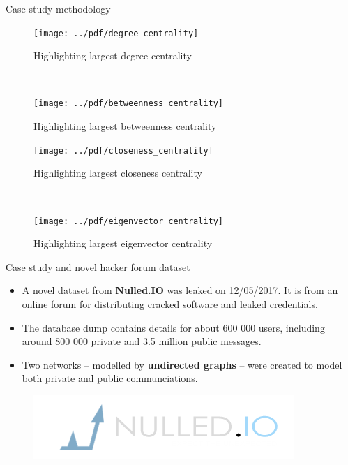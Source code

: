 \documentclass[hyperref={pdfpagelabels=false}]{beamer}
\begin{document}
\begin{frame}[fragile]
\begin{columns}[t]
\begin{column}{.45\textwidth}
\begin{block}{Case study methodology}
  \begin{figure}[H]
  	\begin{minipage}{0.48\columnwidth}
  		\centering
  		\texttt{[image: ../pdf/degree\_centrality]}
  		\caption{Highlighting largest degree centrality}
  		\label{fig:degree_centrality}
  	\end{minipage}
  	~
  	\begin{minipage}{0.48\columnwidth}
  		\centering
  		\texttt{[image: ../pdf/betweenness\_centrality]}
  		\caption{Highlighting largest betweenness centrality}
  		\label{fig:betweenness_centrality}
  	\end{minipage}
  \end{figure}

  \begin{figure}[H]
  	\begin{minipage}{0.48\columnwidth}
  		\centering
  		\texttt{[image: ../pdf/closeness\_centrality]}
  		\caption{Highlighting largest closeness centrality}
  		\label{fig:closeness_centrality}
  	\end{minipage}
  	~
  	\begin{minipage}{0.48\columnwidth}
  		\centering
  		\texttt{[image: ../pdf/eigenvector\_centrality]}
  		\caption{Highlighting largest eigenvector centrality}
  		\label{fig:eigenvector_centrality}
  	\end{minipage}
  \end{figure}
\end{block}

\begin{block}{Case study and novel hacker forum dataset}
  \begin{itemize}
    \item A novel dataset from \textbf{Nulled.IO} was leaked on 12/05/2017. It is from an online forum for distributing cracked software and leaked credentials.
    \item The database dump contains details for about 600 000 users, including around 800 000 private and 3.5 million public messages.
    \item Two networks – modelled by \textbf{undirected graphs} – were created to model both private and public communciations.
  \end{itemize}
  \begin{figure}
    \colorbox{mydark}{\includegraphics[scale=1.2]{figures/nulled.png}}
  \end{figure}
\end{block}


\end{column}
\end{columns}
\end{frame}
\end{document}
